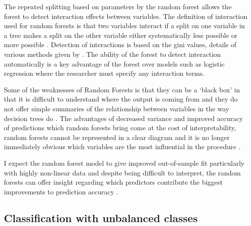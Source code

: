 \documentclass{article}
\begin{document}
The repeated splitting based on parameters by the random forest allows the forest to detect interaction effects between variables. The definition of interaction used for random forests is that two variables interact if a split on one variable in a tree makes a split on the other variable either systematically less possible or more possible \citep{breiman01}. Detection of interactions is based on the gini values,  details of various methods given by \citet{kelly12}. The ability of the forest to detect interaction automatically is a key advantage of the forest over models such as logistic regression where the researcher must specify any interaction terms. 

Some of the weaknesses of Random Forests is that they can be a ‘black box’ in that it is difficult to understand where the output is coming from and they do not offer simple summaries of the relationship between variables in the way decision trees do \citep{varian14}. The advantages of decreased variance and improved accuracy of predictions which random forests bring come at the cost of interpretability, random forests cannot be represented in a clear diagram and it is no longer immediately obvious which variables are the most influential in the procedure \citep{james13}. 

I expect the random forest model to give improved out-of-sample fit particularly with highly non-linear data and despite being difficult to interpret, the random forests can offer insight regarding which predictors contribute the biggest improvements to prediction accuracy \citep{varian14}.


\subsection{Classification with unbalanced classes}
\end{document}
